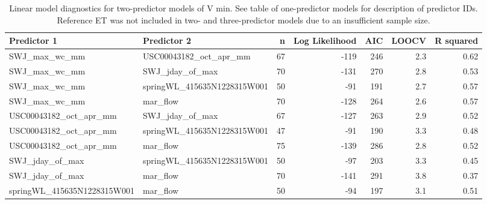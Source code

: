\documentclass[hess, manuscript]{copernicus}
\begin{document}
\begin{table}[ht]
\centering
\caption{Linear model diagnostics for two-predictor models of V min. See table of one-predictor models for description of predictor IDs. Reference ET was not included in two- and three-predictor models due to an insufficient sample size.} 
\label{tab:vmin_tab_2pred}
\begin{tabular}{llrrrrr}
  \hline
Predictor 1 & Predictor 2 & n & Log Likelihood & AIC & LOOCV & R squared \\ 
  \hline
SWJ\_max\_wc\_mm & USC00043182\_oct\_apr\_mm & 67 & -119 & 246 & 2.3 & 0.62 \\ 
  SWJ\_max\_wc\_mm & SWJ\_jday\_of\_max & 70 & -131 & 270 & 2.8 & 0.53 \\ 
  SWJ\_max\_wc\_mm & springWL\_415635N1228315W001 & 50 & -91 & 191 & 2.7 & 0.57 \\ 
  SWJ\_max\_wc\_mm & mar\_flow & 70 & -128 & 264 & 2.6 & 0.57 \\ 
  USC00043182\_oct\_apr\_mm & SWJ\_jday\_of\_max & 67 & -127 & 263 & 2.9 & 0.52 \\ 
  USC00043182\_oct\_apr\_mm & springWL\_415635N1228315W001 & 47 & -91 & 190 & 3.3 & 0.48 \\ 
  USC00043182\_oct\_apr\_mm & mar\_flow & 75 & -139 & 286 & 2.8 & 0.52 \\ 
  SWJ\_jday\_of\_max & springWL\_415635N1228315W001 & 50 & -97 & 203 & 3.3 & 0.45 \\ 
  SWJ\_jday\_of\_max & mar\_flow & 70 & -141 & 291 & 3.8 & 0.37 \\ 
  springWL\_415635N1228315W001 & mar\_flow & 50 & -94 & 197 & 3.1 & 0.51 \\ 
   \hline
\end{tabular}
\end{table}
\end{document}

